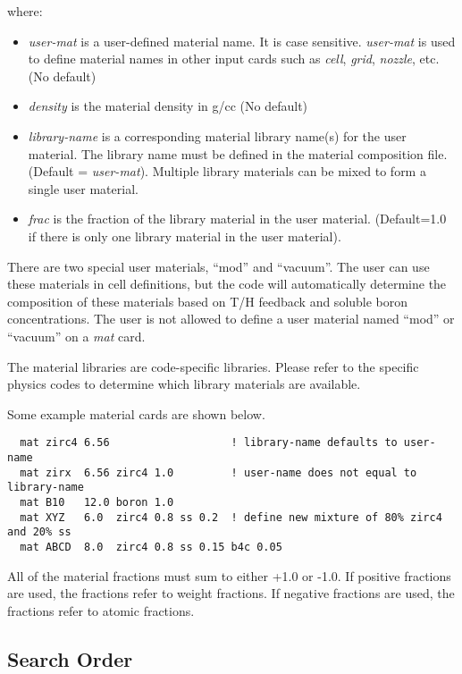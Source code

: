 where:
\begin{itemize}
\item {\it user-mat} is a user-defined material name.  It is case sensitive.  {\it user-mat} is used to
define material names in other input cards such as {\it cell}, {\it grid}, {\it nozzle}, etc. (No default)
\item {\it density} is the material density in g/cc (No default)
\item {\it library-name} is a corresponding material library name(s) for the user material.  The library name
must be defined in the material composition file. (Default = {\it user-mat}).  Multiple library materials
can be mixed to form a single user material.
\item {\it frac}  is the fraction of the library material in the user material. (Default=1.0 if there is only one library material in the user material).
\end{itemize}

There are two special user materials,  ``mod'' and ``vacuum''.
The user can use these materials in cell definitions, but the code will automatically
determine the composition of these materials  based on T/H feedback and soluble boron concentrations.
The user is not allowed to define a user material named ``mod'' or ``vacuum'' on a {\it mat} card.

The material libraries are code-specific libraries.  Please refer to the specific physics codes to
determine which library materials are available.

Some example material cards are shown below.
\begin{verbatim}
  mat zirc4 6.56                   ! library-name defaults to user-name 
  mat zirx  6.56 zirc4 1.0         ! user-name does not equal to library-name
  mat B10   12.0 boron 1.0
  mat XYZ   6.0  zirc4 0.8 ss 0.2  ! define new mixture of 80% zirc4 and 20% ss
  mat ABCD  8.0  zirc4 0.8 ss 0.15 b4c 0.05
\end{verbatim}

All of the material fractions must sum to either +1.0 or -1.0.
If positive fractions are used, the fractions refer to weight fractions.
If negative fractions are used, the fractions refer to atomic fractions.

\subsection{Search Order}

